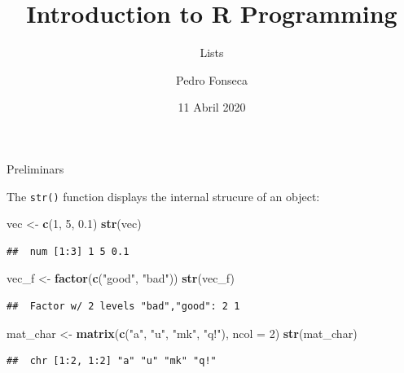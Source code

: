 \documentclass[ignorenonframetext,]{beamer}
\title{Introduction to R Programming}
\subtitle{Lists}
\author{Pedro Fonseca}
\date{11 Abril 2020}
\newenvironment{Shaded}{\begin{snugshade}}{\end{snugshade}}
\newcommand{\DataTypeTok}[1]{\textcolor[rgb]{0.13,0.29,0.53}{#1}}
\newcommand{\DecValTok}[1]{\textcolor[rgb]{0.00,0.00,0.81}{#1}}
\newcommand{\FloatTok}[1]{\textcolor[rgb]{0.00,0.00,0.81}{#1}}
\newcommand{\KeywordTok}[1]{\textcolor[rgb]{0.13,0.29,0.53}{\textbf{#1}}}
\newcommand{\NormalTok}[1]{#1}
\newcommand{\StringTok}[1]{\textcolor[rgb]{0.31,0.60,0.02}{#1}}
\begin{document}
\frame{\titlepage}

\begin{frame}[fragile]{Preliminars}
\protect\hypertarget{preliminars}{}

The \texttt{str()} function displays the internal strucure of an object:

\begin{Shaded}
\begin{Highlighting}[]
\NormalTok{vec <-}\StringTok{ }\KeywordTok{c}\NormalTok{(}\DecValTok{1}\NormalTok{, }\DecValTok{5}\NormalTok{, }\FloatTok{0.1}\NormalTok{)}
\KeywordTok{str}\NormalTok{(vec)}
\end{Highlighting}
\end{Shaded}

\begin{verbatim}
##  num [1:3] 1 5 0.1
\end{verbatim}

\begin{Shaded}
\begin{Highlighting}[]
\NormalTok{vec_f <-}\StringTok{ }\KeywordTok{factor}\NormalTok{(}\KeywordTok{c}\NormalTok{(}\StringTok{"good"}\NormalTok{, }\StringTok{"bad"}\NormalTok{))}
\KeywordTok{str}\NormalTok{(vec_f)}
\end{Highlighting}
\end{Shaded}

\begin{verbatim}
##  Factor w/ 2 levels "bad","good": 2 1
\end{verbatim}

\begin{Shaded}
\begin{Highlighting}[]
\NormalTok{mat_char <-}\StringTok{ }\KeywordTok{matrix}\NormalTok{(}\KeywordTok{c}\NormalTok{(}\StringTok{"a"}\NormalTok{, }\StringTok{"u"}\NormalTok{, }\StringTok{"mk"}\NormalTok{, }\StringTok{"q!"}\NormalTok{), }\DataTypeTok{ncol =} \DecValTok{2}\NormalTok{)}
\KeywordTok{str}\NormalTok{(mat_char)}
\end{Highlighting}
\end{Shaded}

\begin{verbatim}
##  chr [1:2, 1:2] "a" "u" "mk" "q!"
\end{verbatim}

\end{frame}
\end{document}
